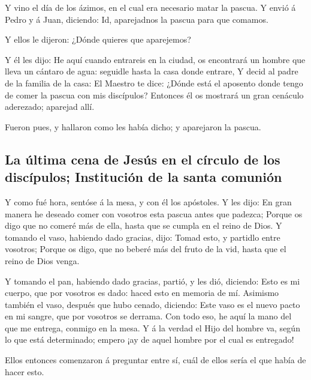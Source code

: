  Y vino el día de los ázimos, en el cual era necesario
matar la pascua.  Y envió á Pedro y á Juan, diciendo: Id,
aparejadnos la pascua para que comamos.

 Y ellos le dijeron: ¿Dónde quieres que aparejemos?

 Y él les dijo: He aquí cuando entrareis en la ciudad, os
encontrará un hombre que lleva un cántaro de agua: seguidle hasta la
casa donde entrare,  Y decid al padre de la familia de la
casa: El Maestro te dice: ¿Dónde está el aposento donde tengo de comer
la pascua con mis discípulos?  Entonces él os mostrará un
gran cenáculo aderezado; aparejad allí.

 Fueron pues, y hallaron como les había dicho; y
aparejaron la pascua.

\hypertarget{la-uxfaltima-cena-de-jesuxfas-en-el-cuxedrculo-de-los-discuxedpulos-instituciuxf3n-de-la-santa-comuniuxf3n}{%
\subsection{La última cena de Jesús en el círculo de los discípulos;
Institución de la santa
comunión}\label{la-uxfaltima-cena-de-jesuxfas-en-el-cuxedrculo-de-los-discuxedpulos-instituciuxf3n-de-la-santa-comuniuxf3n}}

 Y como fué hora, sentóse á la mesa, y con él los
apóstoles.  Y les dijo: En gran manera he deseado comer
con vosotros esta pascua antes que padezca;  Porque os
digo que no comeré más de ella, hasta que se cumpla en el reino de Dios.
 Y tomando el vaso, habiendo dado gracias, dijo: Tomad
esto, y partidlo entre vosotros;  Porque os digo, que no
beberé más del fruto de la vid, hasta que el reino de Dios venga.

 Y tomando el pan, habiendo dado gracias, partió, y les
dió, diciendo: Esto es mi cuerpo, que por vosotros es dado: haced esto
en memoria de mí.  Asimismo también el vaso, después que
hubo cenado, diciendo: Este vaso es el nuevo pacto en mi sangre, que por
vosotros se derrama.  Con todo eso, he aquí la mano del
que me entrega, conmigo en la mesa.  Y á la verdad el
Hijo del hombre va, según lo que está determinado; empero ¡ay de aquel
hombre por el cual es entregado!

 Ellos entonces comenzaron á preguntar entre sí, cuál de
ellos sería el que había de hacer esto.

